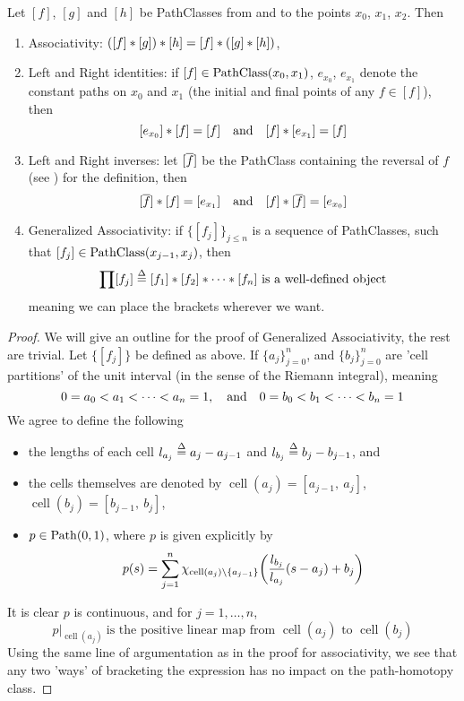 \documentclass[../main-manifolds.tex]{subfiles}
\begin{document}
\begin{wts}\label{munkres:theorem51.2}
    Let $[f]$, $[g]$ and $[h]$ be PathClasses from and to the points $x_0$, $x_1$, $x_2$. Then
    \begin{enumerate}
        \item Associativity: $([f]\ast [g])\ast[h]=[f]\ast ([g]\ast[h])$,
        \item Left and Right identities: if $[f]\in\PathClass[x_0,x_1]$, $e_{x_0}$, $e_{x_1}$ denote the constant paths on $x_0$ and $x_1$ (the initial and final points of any $f\in [f]$), then
        \[
            [e_{x_0}]\cnv[f]=[f]\qqtext{and}[f]\cnv[e_{x_1}]=[f]
        \]
        \item Left and Right inverses: let $[\overline{f}]$ be the PathClass containing the reversal of $f$ (see ) for the definition, then 
        \[
            [\cl{f}]\cnv[f]=[e_{x_1}]\qqtext{and}[f]\cnv[\cl{f}]=[e_{x_0}]
        \]
        \item Generalized Associativity: if $\{[f_j]\}_{j\leq n}$ is a sequence of PathClasses, such that $[f_j]\in\PathClass[x_{j-1},x_j]$, then 
        \[
            \prod [f_j]\overset{\Delta}{=}[f_1]\ast[f_2]\ast\cdots\ast[f_n]\text{ is a well-defined object}
        \]
        meaning we can place the brackets wherever we want.
    \end{enumerate}
\end{wts}
\begin{proof}
    We will give an outline for the proof of Generalized Associativity, the rest are trivial. Let $\{[f_j]\}$ be defined as above. If $\{a_j\}_{j=0}^n$, and $\{b_j\}_{j=0}^n$ are 'cell partitions' of the unit interval (in the sense of the Riemann integral), meaning
    \[
    0=a_0<a_1<\cdots<a_n=1,\qqtext{and}0=b_0<b_1<\cdots<b_n=1
    \]
    We agree to define the following
    \begin{itemize}
        \item the lengths of each cell $l_{a_j}\overset{\Delta}{=} a_j-a_{j-1}$ and $l_{b_j}\overset{\Delta}{=} b_j-b_{j-1}$, and
        \item the cells themselves are denoted by $\operatorname{cell}(a_j)=[a_{j-1},\: a_j]$, $\operatorname{cell}(b_j)=[b_{j-1},\: b_j]$,
        \item $p\in\Path[0,1]$, where $p$ is given explicitly by
        \[
            p(s) = \sum_{j=1}^n\chi_{\operatorname{cell}(a_j)\setminus\{a_{j-1}\}}\qty(\frac{l_{b_j}}{l_{a_j}}(s-a_j) + b_j)
        \]
    \end{itemize}
    It is clear $p$ is continuous, and for $j=1,\ldots,n$, 
    \[
        p|_{\operatorname{cell}(a_j)}\:\text{is the positive linear map from }\operatorname{cell}(a_j)\text{ to }\operatorname{cell}(b_j)
    \]
    Using the same line of argumentation as in the proof for associativity, we see that any two 'ways' of bracketing the expression has no impact on the path-homotopy class.
\end{proof}
\end{document}
